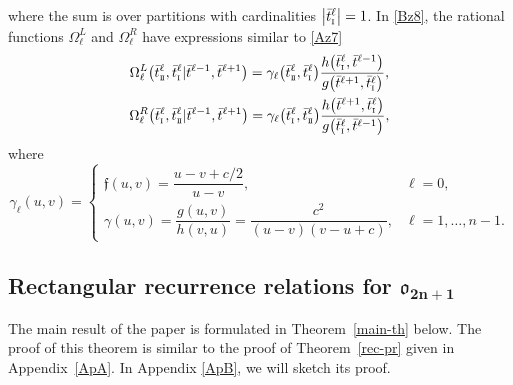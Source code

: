 \documentclass[pdftex]{sigma}
\newcommand{\so}{\scriptscriptstyle \rm I}
\newcommand{\st}{\scriptscriptstyle \rm I\hspace{-1pt}I}
\newcommand{\bt}{{\bar t}}
\theoremstyle{definition}
\def\r#1{\eqref{#1}}
\def\fgo{\mathfrak{f}}
\def\Oml{\Omega^L}
\def\Omr{\Omega^R}
\begin{document}
\pagebreak

\noindent
where the sum is over partitions with cardinalities $\big|\bt^\ell_{\so}\big|=1$.
In \r{Bz8}, the rational functions
$\Oml_\ell$ and
$\Omr_\ell$ have
expressions similar to \r{Az7}
\begin{gather}
\Oml_\ell\bigl(\bt^\ell_{\st},\bt^\ell_{\so}|\bt^{\ell-1},\bt^{\ell+1}\bigr)=
\gamma_\ell\bigl(\bt^\ell_{\st},\bt^\ell_{\so}\bigr)
 \frac{h\bigl(\bt^\ell_{\so},\bt^{\ell-1}\bigr)}{g\bigl(\bt^{\ell+1},\bt^\ell_{\so}\bigr)},\nonumber\\
\Omr_\ell\bigl(\bt^\ell_{\so},\bt^\ell_{\st}|\bt^{\ell-1},\bt^{\ell+1}\bigr)=
\gamma_\ell\bigl(\bt^\ell_{\so},\bt^\ell_{\st}\bigr)
 \frac{h\bigl(\bt^{\ell+1},\bt^\ell_{\so}\bigr)}{g\bigl(\bt^\ell_{\so},\bt^{\ell-1}\bigr)} ,\label{Bz10}
\end{gather}
where
\[%
\gamma_\ell(u,v)=
\begin{cases}
\fgo(u,v)=\dfrac{u-v+c/2}{u-v},&\ell=0,\\
\gamma(u,v)=\dfrac{g(u,v)}{h(v,u)}=\dfrac{c^2}{(u-v)(v-u+c)},
&\ell=1,\dots,n-1.
\end{cases}
\]


\subsection[Rectangular recurrence relations for o\_2n+1]{Rectangular recurrence relations for $\boldsymbol{\mathfrak{o}_{2n+1}}$}\label{sect:rec-oN}

The main result of the paper is formulated in Theorem~\ref{main-th} below.
The proof of this theorem is similar to the proof of Theorem~\ref{rec-pr} given in Appendix~\ref{ApA}. In Appendix \ref{ApB}, we will sketch its proof.
\end{document}
